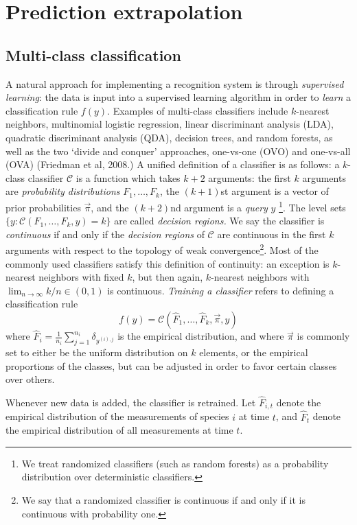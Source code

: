 \documentclass{article}
\begin{document}
\section{Prediction extrapolation}

\subsection{Multi-class classification}

A natural approach for implementing a recognition system is through
\emph{supervised learning}: the data is input into a supervised
learning algorithm in order to \emph{learn} a classification rule
$f(y)$.  Examples of multi-class classifiers include $k$-nearest
neighbors, multinomial logistic regression, linear discriminant
analysis (LDA), quadratic discriminant analysis (QDA), decision trees,
and random forests, as well as the two `divide and conquer'
approaches, one-vs-one (OVO) and one-vs-all (OVA) (Friedman et al,
2008.)  A unified definition of a classifier is as follows: a
$k$-class classifier $\mathcal{C}$ is a function which takes $k+2$
arguments: the first $k$ arguments are \emph{probability
  distributions} $F_1,\hdots, F_k$, the $(k+1)$st argument is a vector
of prior probabilities $\vec{\pi}$, and the $(k+2)$nd argument is a
\emph{query} $y$
\footnote{We treat randomized classifiers (such as random forests) as
  a probability distribution over deterministic classifiers.}.  The
level sets $\{y: \mathcal{C}(F_1,\hdots, F_k, y) = k\}$ are called
\emph{decision regions.}  We say the classifier is \emph{continuous}
if and only if the \emph{decision regions} of $\mathcal{C}$ are
continuous in the first $k$ arguments with respect to the topology of
weak convergence\footnote{We say that a randomized classifier is
  continuous if and only if it is continuous with probability one.}.
Most of the commonly used classifiers satisfy this definition of
continuity: an exception is $k$-nearest neighbors with fixed $k$, but
then again, $k$-nearest neighbors with $\lim_{n \to \infty} k/n \in
(0, 1)$ is continuous.  \emph{Training a classifier} refers to
defining a classification rule
\[
f(y) = \mathcal{C}(\hat{F}_1,\hdots, \hat{F}_k, \vec{\pi}, y)
\]
where $\hat{F}_i = \frac{1}{n_i}\sum_{j=1}^{n_i} \delta_{y^{(i), j}}$
is the empirical distribution, and where $\vec{\pi}$ is commonly set
to either be the uniform distribution on $k$ elements, or the
empirical proportions of the classes, but can be adjusted in order to
favor certain classes over others.

Whenever new data is added, the classifier is retrained.  
Let $\hat{F}_{i, t}$ denote the empirical distribution of the
measurements of species $i$ at time $t$, and $\hat{F}_t$ denote the
empirical distribution of all measurements at time $t$.
\end{document}
